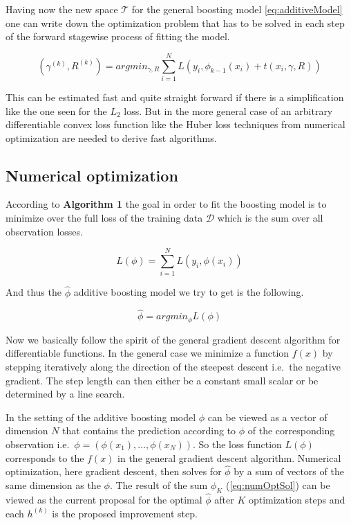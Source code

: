 \documentclass[
]{book}
\begin{document}
Having now the new space \(\mathcal{T}\) for the general boosting model \eqref{eq:additiveModel} one can write down the optimization problem that has to be solved in each step of the forward stagewise process of fitting the model.

\begin{equation}
  (\gamma^{(k)},R^{(k)}) = argmin_{\gamma,R} \sum_{i=1}^N L(y_i, \phi_{k-1}(x_i) + t(x_i,\gamma,R))
  \label{eq:oneStepTreeBoost}
\end{equation}

This can be estimated fast and quite straight forward if there is a simplification like the one seen for the \(L_2\) loss. But in the more general case of an arbitrary differentiable convex loss function like the Huber loss techniques from numerical optimization are needed to derive fast algorithms.\citep{elements}

\hypertarget{numerical-optimization}{%
\subsection{Numerical optimization}\label{numerical-optimization}}

According to \textbf{Algorithm 1} the goal in order to fit the boosting model is to minimize over the full loss of the training data \(\mathcal{D}\) which is the sum over all observation losses.

\[
L(\phi) = \sum_{i=1}^N L(y_i, \phi(x_i))
\]

And thus the \(\hat{\phi}\) additive boosting model we try to get is the following.

\[
\hat{\phi} = argmin_{\phi} L(\phi)
\]

Now we basically follow the spirit of the general gradient descent algorithm for differentiable functions. In the general case we minimize a function \(f(x)\) by stepping iteratively along the direction of the steepest descent i.e.~the negative gradient. The step length can then either be a constant small scalar or be determined by a line search.

In the setting of the additive boosting model \(\phi\) can be viewed as a vector of dimension \(N\) that contains the prediction according to \(\phi\) of the corresponding observation i.e.~\(\phi = (\phi(x_1),...,\phi(x_N))\). So the loss function \(L(\phi)\) corresponds to the \(f(x)\) in the general gradient descent algorithm. Numerical optimization, here gradient descent, then solves for \(\hat{\phi}\) by a sum of vectors of the same dimension as the \(\phi\).\citep{elements} The result of the sum \(\phi_K\) (\eqref{eq:numOptSol}) can be viewed as the current proposal for the optimal \(\hat{\phi}\) after \(K\) optimization steps and each \(h^{(k)}\) is the proposed improvement step.
\end{document}
